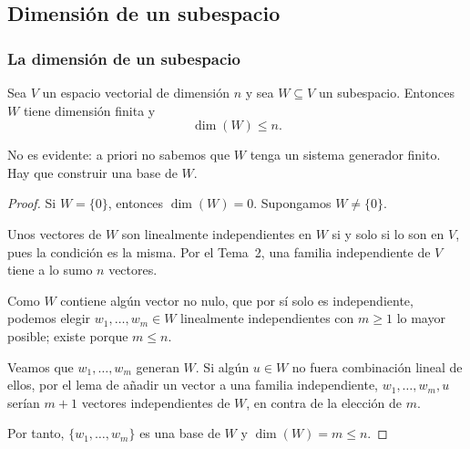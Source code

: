 \subsection{Dimensión de un subespacio}

\begin{frame}[allowframebreaks]
    \frametitle{La dimensión de un subespacio}

    \begin{theorem}
        Sea $V$ un espacio vectorial de dimensión $n$ y sea $W\subseteq V$
        un subespacio. Entonces $W$ tiene dimensión finita y
        \[
            \dim(W)\leq n.
        \]
    \end{theorem}

    \medskip

    No es evidente: a priori no sabemos que $W$ tenga un sistema generador
    finito. Hay que \alert{construir} una base de $W$.

    \framebreak

    \begin{proof}
        Si $W=\{0\}$, entonces $\dim(W)=0$. Supongamos $W\neq\{0\}$.

        \medskip

        Unos vectores de $W$ son linealmente independientes en $W$ si y solo
        si lo son en $V$, pues la condición es la misma. Por el Tema~2, una
        familia independiente de $V$ tiene a lo sumo $n$ vectores.

        \medskip

        Como $W$ contiene algún vector no nulo, que por sí solo es
        independiente, podemos elegir $w_1,\ldots,w_m\in W$ linealmente
        independientes con $m\geq1$ \alert{lo mayor posible}; existe porque
        $m\leq n$.

        \medskip

        Veamos que $w_1,\ldots,w_m$ generan $W$. Si algún $u\in W$ no fuera
        combinación lineal de ellos, por el lema de añadir un vector a una
        familia independiente, $w_1,\ldots,w_m,u$ serían $m+1$ vectores
        independientes de $W$, en contra de la elección de $m$.

        \medskip

        Por tanto, $\{w_1,\ldots,w_m\}$ es una base de $W$ y
        $\dim(W)=m\leq n$.
    \end{proof}
\end{frame}

